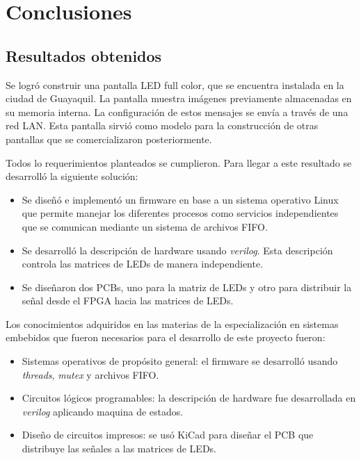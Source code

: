
\chapter{Conclusiones} %

\label{Chapter5} %



\section{Resultados obtenidos}




Se logró construir una pantalla LED full color, que se encuentra instalada en la ciudad de Guayaquil. La pantalla muestra imágenes previamente almacenadas en su memoria interna. La configuración de estos mensajes se envía a través de una red LAN. Esta pantalla sirvió como modelo para la construcción de otras pantallas que se comercializaron posteriormente.

Todos lo requerimientos planteados se cumplieron. Para llegar a este resultado se desarrolló la siguiente solución:
\begin{itemize}
\item Se diseñó e implementó un firmware en base a un sistema operativo Linux que permite manejar los diferentes procesos como servicios independientes que se comunican mediante un sistema de archivos FIFO.
\item Se desarrolló la descripción de hardware usando \textit{verilog}.  Esta descripción controla las matrices de LEDs de manera independiente.
\item Se diseñaron dos PCBs, uno para la matriz de LEDs y otro para distribuir la señal desde el FPGA hacia las matrices de LEDs.
\end{itemize}
Los conocimientos adquiridos en las materias de la especialización en sistemas embebidos que fueron necesarios para el desarrollo de este proyecto fueron:
\begin{itemize}
\item Sistemas operativos de propósito general: el firmware se desarrolló usando \textit{threads}, \textit{mutex} y archivos FIFO.
\item Circuitos lógicos programables: la descripción de hardware fue desarrollada en \textit{verilog} aplicando maquina de estados.
\item Diseño de circuitos impresos: se usó KiCad para diseñar el PCB que distribuye las señales a las matrices de LEDs.
\end{itemize}


